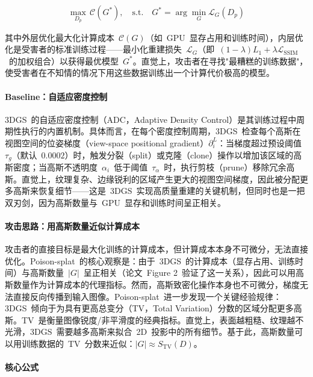 \begin{equation}
\max_{D_p} \, \mathcal{C}(G^*), \quad \text{s.t.} \quad G^* = \arg\min_{G} \mathcal{L}_G(D_p)
\end{equation}

其中外层优化最大化计算成本~$\mathcal{C}(G)$（如~GPU~显存占用和训练时间），内层优化是受害者的标准训练过程——最小化重建损失~$\mathcal{L}_G$（即~$(1-\lambda)L_1 + \lambda \mathcal{L}_{\text{SSIM}}$~的加权组合）以获得最优模型~$G^*$。直觉上，攻击者在寻找"最糟糕的训练数据"，使受害者在不知情的情况下用这些数据训练出一个计算代价极高的模型。

\paragraph{Baseline：自适应密度控制}

3DGS~的自适应密度控制（ADC，Adaptive Density Control）是其训练过程中周期性执行的内置机制。具体而言，在每个密度控制周期，3DGS~检查每个高斯在视图空间的位姿梯度（view-space positional gradient）$\partial_i^L$：当梯度超过预设阈值~$\tau_g$（默认~$0.0002$）时，触发分裂（split）或克隆（clone）操作以增加该区域的高斯密度；当高斯不透明度~$\alpha_i$~低于阈值~$\tau_\alpha$~时，执行剪枝（prune）移除冗余高斯。直觉上，纹理复杂、边缘锐利的区域产生更大的视图空间梯度，因此被分配更多高斯来恢复细节——这是~3DGS~实现高质量重建的关键机制，但同时也是一把双刃剑，因为高斯数量与~GPU~显存和训练时间呈正相关。

\paragraph{攻击思路：用高斯数量近似计算成本}

攻击者的直接目标是最大化训练的计算成本，但计算成本本身不可微分，无法直接优化。Poison-splat~的核心观察是：由于~3DGS~的计算成本（显存占用、训练时间）与高斯数量~$|G|$~呈正相关（论文~Figure 2~验证了这一关系），因此可以用高斯数量作为计算成本的代理指标。然而，高斯致密化操作本身也不可微分，梯度无法直接反向传播到输入图像。Poison-splat~进一步发现一个关键经验规律：3DGS~倾向于为具有更高总变分（TV，Total Variation）分数的区域分配更多高斯。TV~是衡量图像锐度/非平滑度的经典指标。直觉上，表面越粗糙、纹理越不光滑，3DGS~需要越多高斯来拟合~2D~投影中的所有细节。基于此，高斯数量可以用训练数据的~TV~分数来近似：$|G| \approx S_{\text{TV}}(D)$。

\paragraph{核心公式}

